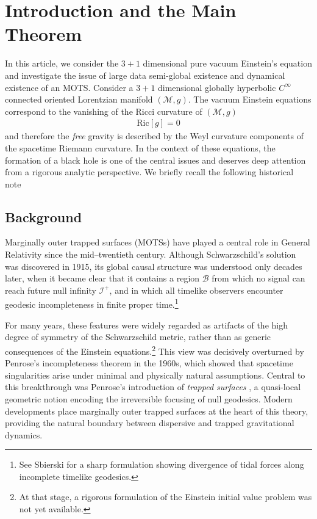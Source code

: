 \documentclass{amsart}
\begin{document}





\setcounter{tocdepth}{2}
{\hypersetup{linkcolor=black}
\small
\tableofcontents
}



\section{Introduction and the Main Theorem}
\noindent In this article, we consider the $3+1$ dimensional pure vacuum Einstein's equation and investigate the issue of large data semi-global existence and dynamical existence of an MOTS. Consider a $3+1$ dimensional globally hyperbolic $C^{\infty}$ connected oriented Lorentzian manifold $(\mathcal{M},g)$. The vacuum Einstein equations correspond to the vanishing of the Ricci curvature of $(\mathcal{M},g)$
\begin{align}
\label{eq:1}
 \text{Ric}[g]=0   
\end{align}
and therefore the \textit{free} gravity is described by the Weyl curvature components of the spacetime Riemann curvature. In the context of these equations, the formation of a black hole is one of the central issues and deserves deep attention from a rigorous analytic perspective. We briefly recall the following historical note 
\subsection{Background} \noindent Marginally outer trapped surfaces (MOTSs) have played a central role in General Relativity since the mid--twentieth century. Although Schwarzschild’s solution was discovered in 1915, its global causal structure was understood only decades later, when it became clear that it contains a region $\mathcal B$ from which no signal can reach future null infinity $\mathcal I^{+}$, and in which all timelike observers encounter geodesic incompleteness in finite proper time.\footnote{See Sbierski \cite{Sb} for a sharp formulation showing divergence of tidal forces along incomplete timelike geodesics.}

\noindent For many years, these features were widely regarded as artifacts of the high degree of symmetry of the Schwarzschild metric, rather than as generic consequences of the Einstein equations.\footnote{At that stage, a rigorous formulation of the Einstein initial value problem was not yet available.} This view was decisively overturned by Penrose’s incompleteness theorem in the 1960s, which showed that spacetime singularities arise under minimal and physically natural assumptions. Central to this breakthrough was Penrose’s introduction of \emph{trapped surfaces} \cite{P73}, a quasi-local geometric notion encoding the irreversible focusing of null geodesics. Modern developments place marginally outer trapped surfaces at the heart of this theory, providing the natural boundary between dispersive and trapped gravitational dynamics.
\end{document}
